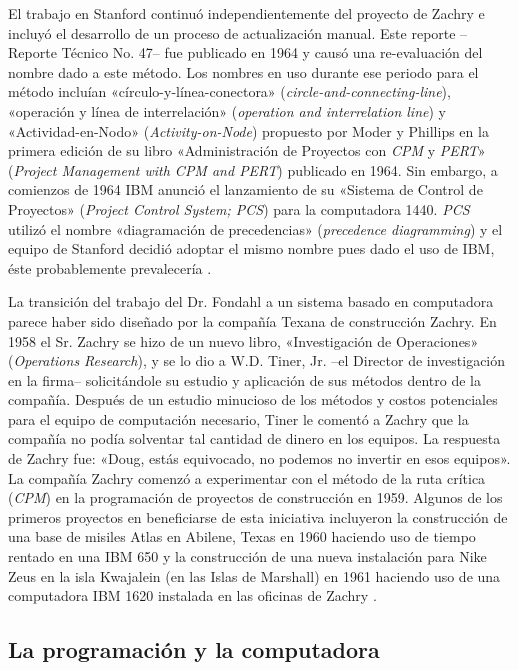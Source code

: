 \documentclass[spanish,draft,12pt,headsepline,footsepline,paper=letter]{scrreprt}
\begin{document}
El trabajo en Stanford continuó independientemente del proyecto de Zachry e incluyó el desarrollo de un proceso de actualización manual. Este reporte –Reporte Técnico No. 47– fue publicado en 1964 y causó una re-evaluación del nombre dado a este método. Los nombres en uso durante ese periodo para el método incluían «círculo-y-línea-conectora» (\textit{circle-and-connecting-line}), «operación y línea de interrelación» (\textit{operation and interrelation line}) y «Actividad-en-Nodo» (\textit{Activity-on-Node}) propuesto por Moder y Phillips en la primera edición de su libro «Administración de Proyectos con \textit{CPM} y \textit{PERT}» (\textit{Project Management with CPM and PERT}) publicado en 1964. Sin embargo, a comienzos de 1964 IBM anunció el lanzamiento de su «Sistema de Control de Proyectos» (\textit{Project Control System; PCS}) para la computadora 1440. \textit{PCS} utilizó el nombre «diagramación de precedencias» (\textit{precedence diagramming}) y el equipo de Stanford decidió adoptar el mismo nombre pues dado el uso de IBM, éste probablemente prevalecería \citep[p.~9]{Weaver2006}.

La transición del trabajo del Dr. Fondahl a un sistema basado en computadora parece haber sido diseñado por la compañía Texana de construcción Zachry. En 1958 el Sr. Zachry se hizo de un nuevo libro, «Investigación de Operaciones» (\textit{Operations Research}), y se lo dio a W.D. Tiner, Jr. –el Director de investigación en la firma– solicitándole su estudio y aplicación de sus métodos dentro de la compañía. Después de un estudio minucioso de los métodos y costos potenciales para el equipo de computación necesario, Tiner le comentó a Zachry que la compañía no podía solventar tal cantidad de dinero en los equipos. La respuesta de Zachry fue: «Doug, estás equivocado, no podemos no invertir en esos equipos».
%
La compañía Zachry comenzó a experimentar con el método de la ruta crítica (\textit{CPM}) en la programación de proyectos de construcción en 1959. Algunos de los primeros proyectos en beneficiarse de esta iniciativa incluyeron la construcción de una base de misiles Atlas en Abilene, Texas en 1960 haciendo uso de tiempo rentado en una IBM 650 y la construcción de una nueva instalación para Nike Zeus en la isla Kwajalein (en las Islas de Marshall) en 1961 haciendo uso de una computadora IBM 1620 instalada en las oficinas de Zachry \citep[p.~9,~10]{Weaver2006}.


\subsection{La programación y la computadora} %
\label{sub:programacion_computadora}
\end{document}
